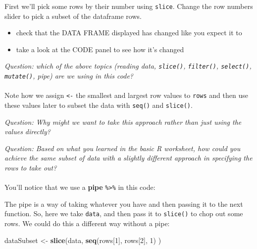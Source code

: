 \documentclass[
]{book}
\newenvironment{Shaded}{\begin{snugshade}}{\end{snugshade}}
\newcommand{\DecValTok}[1]{\textcolor[rgb]{0.00,0.00,0.81}{#1}}
\newcommand{\KeywordTok}[1]{\textcolor[rgb]{0.13,0.29,0.53}{\textbf{#1}}}
\newcommand{\NormalTok}[1]{#1}
\newcommand{\OperatorTok}[1]{\textcolor[rgb]{0.81,0.36,0.00}{\textbf{#1}}}
\newcommand{\StringTok}[1]{\textcolor[rgb]{0.31,0.60,0.02}{#1}}
\providecommand{\tightlist}{%
  \setlength{\itemsep}{0pt}\setlength{\parskip}{0pt}}
\begin{document}
First we'll pick some rows by their number using \texttt{slice}. Change the row numbers
slider to pick a subset of the dataframe rows.

\begin{itemize}
\tightlist
\item
  check that the DATA FRAME displayed has changed like you expect it to
\item
  take a look at the CODE panel to see how it's changed
\end{itemize}

\emph{Question: which of the above topics (reading data, \texttt{slice()}, \texttt{filter()},
\texttt{select()}, \texttt{mutate()}, pipe) are we using in this code?}\\
~\\

Note how we assign \texttt{\textless{}-} the smallest and largest row values to
\texttt{rows} and then use these values later to subset the data with \texttt{seq()} and
\texttt{slice()}.

\emph{Question: Why might we want to take this approach rather than just using
the values directly?}

\emph{Question: Based on what you learned in the basic R worksheet, how could you
achieve the same subset of data with a slightly different approach in
specifying the rows to take out?}\\
~\\

You'll notice that we use a \textbf{pipe} \texttt{\%\textgreater{}\%} in this code:

\begin{Shaded}
\end{Shaded}

The pipe is a way of taking whatever you have and then passing it to the next
function. So, here we take \texttt{data}, and then pass it to \texttt{slice()} to chop out
some rows. We could do this a different way without a pipe:

\begin{Shaded}
\begin{Highlighting}[]
\NormalTok{dataSubset <-}\StringTok{ }\KeywordTok{slice}\NormalTok{(data, }\KeywordTok{seq}\NormalTok{(rows[}\DecValTok{1}\NormalTok{], rows[}\DecValTok{2}\NormalTok{], }\DecValTok{1}\NormalTok{) )}
\end{Highlighting}
\end{Shaded}
\end{document}
